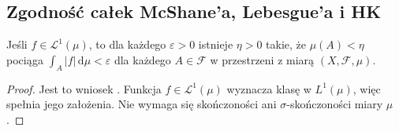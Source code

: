 \subsection{Zgodność całek McShane'a, Lebesgue'a i HK}
\begin{lemat}\label{it:lem:integral-absolute-continuity}\label{ma1:kh:lem:integral-ac}
Jeśli $f\in\mathcal L^1(\mu)$, to dla każdego $\varepsilon>0$ istnieje $\eta>0$ takie, że $\mu(A)<\eta$ pociąga $\int_A|f|\,\mathrm d\mu<\varepsilon$ dla każdego $A\in\mathcal F$ w przestrzeni z miarą $(X,\mathcal F,\mu)$.
\end{lemat}
\begin{proof}
Jest to wniosek
.
Funkcja $f\in\mathcal L^1(\mu)$ wyznacza klasę w $L^1(\mu)$,
więc spełnia jego założenia. Nie wymaga się skończoności
ani $\sigma$-skończoności miary $\mu$.
\end{proof}

